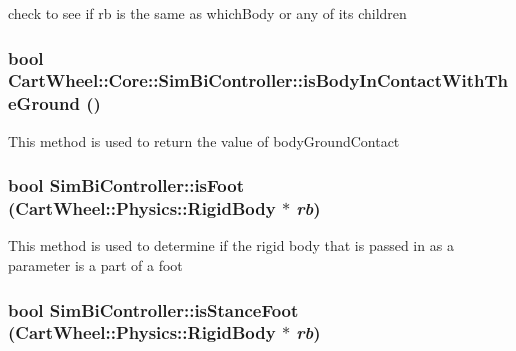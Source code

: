 \label{classCartWheel_1_1Core_1_1SimBiController_a13618b2a089465535686d18e58856a08}
check to see if rb is the same as whichBody or any of its children \hypertarget{classCartWheel_1_1Core_1_1SimBiController_abb6c500d0bde2d3e015109a050cc3b9a}{
\subsubsection[{isBodyInContactWithTheGround}]{\setlength{\rightskip}{0pt plus 5cm}bool CartWheel::Core::SimBiController::isBodyInContactWithTheGround ()}}
\label{classCartWheel_1_1Core_1_1SimBiController_abb6c500d0bde2d3e015109a050cc3b9a}
This method is used to return the value of bodyGroundContact \hypertarget{classCartWheel_1_1Core_1_1SimBiController_a2eb95d96778348a0ce085a4750f4bdc0}{
\subsubsection[{isFoot}]{\setlength{\rightskip}{0pt plus 5cm}bool SimBiController::isFoot ({\bf CartWheel::Physics::RigidBody} $\ast$ {\em rb})}}
\label{classCartWheel_1_1Core_1_1SimBiController_a2eb95d96778348a0ce085a4750f4bdc0}
This method is used to determine if the rigid body that is passed in as a parameter is a part of a foot \hypertarget{classCartWheel_1_1Core_1_1SimBiController_a7f1a872f10bd7aaa236212a7f5143786}{
\subsubsection[{isStanceFoot}]{\setlength{\rightskip}{0pt plus 5cm}bool SimBiController::isStanceFoot ({\bf CartWheel::Physics::RigidBody} $\ast$ {\em rb})}}
